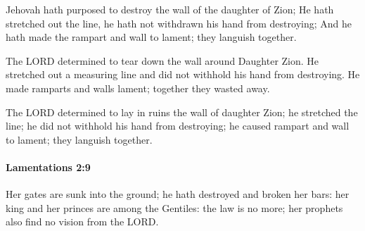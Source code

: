 			\begin{versebox}
					\item[BHS] 
					\item[LXX] 
					\item[ASV] Jehovah hath purposed to destroy the wall of the daughter of Zion; He hath stretched out the line, he hath not withdrawn his hand from destroying; And he hath made the rampart and wall to lament; they languish together.
					\item[NIV] The LORD determined to tear down the wall around Daughter Zion. He stretched out a measuring line and did not withhold his hand from destroying. He made ramparts and walls lament; together they wasted away.
					\item[NRSV] The LORD determined to lay in ruins the wall of daughter Zion; he stretched the line; he did not withhold his hand from destroying; he caused rampart and wall to lament; they languish together.
			\end{versebox}

		\paragraph{Lamentations 2:9} %
			\label{LAMENTATIONS-2-9}

			Her gates are sunk into the ground; he hath destroyed and broken her bars: her king and her princes are among the Gentiles: the law is no more; her prophets also find no vision from the LORD.

